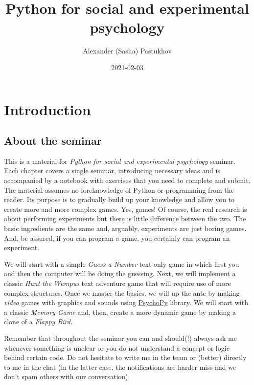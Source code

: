 \documentclass[
]{book}
\title{Python for social and experimental psychology}
\author{Alexander (Sasha) Pastukhov}
\date{2021-02-03}
\begin{document}
\maketitle

{
\setcounter{tocdepth}{1}
\tableofcontents
}
\hypertarget{introduction}{%
\chapter*{Introduction}\label{introduction}}

\hypertarget{about-the-seminar}{%
\section*{About the seminar}\label{about-the-seminar}}

This is a material for \emph{Python for social and experimental psychology} seminar. Each chapter covers a single seminar, introducing necessary ideas and is accompanied by a notebook with exercises that you need to complete and submit. The material assumes no foreknowledge of Python or programming from the reader. Its purpose is to gradually build up your knowledge and allow you to create more and more complex games. Yes, games! Of course, the real research is about performing experiments but there is little difference between the two. The basic ingredients are the same and, arguably, experiments are just boring games. And, be assured, if you can program a game, you certainly can program an experiment.

We will start with a simple \emph{Guess a Number} text-only game in which first you and then the computer will be doing the guessing. Next, we will implement a classic \emph{Hunt the Wumpus} text adventure game that will require use of more complex structures. Once we master the basics, we will up the ante by making \emph{video} games with graphics and sounds using \href{https://psychopy.org/}{PsychoPy} library. We will start with a classic \emph{Memory Game} and, then, create a more dynamic game by making a clone of a \emph{Flappy Bird}.

Remember that throughout the seminar you can and should(!) always ask me whenever something is unclear or you do not understand a concept or logic behind certain code. Do not hesitate to write me in the team or (better) directly to me in the chat (in the latter case, the notifications are harder miss and we don't spam others with our conversation).
\end{document}
